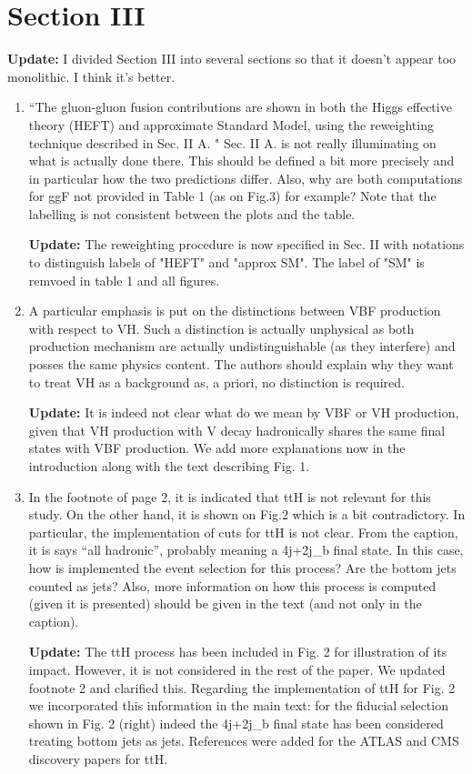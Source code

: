 \documentclass[12pt]{article}
\begin{document}
\section*{Section III}
{\bf Update:} I divided Section III into several sections so that it doesn't appear too monolithic. I think it's better. 
\begin{enumerate}
\item ``The gluon-gluon fusion contributions are shown in both the Higgs effective theory (HEFT) and approximate Standard Model, using the reweighting technique described in Sec. II A. " Sec. II A. is not really illuminating on what is actually done there. This should be defined a bit more precisely and in particular how the two predictions differ. Also, why are both computations for ggF not provided in Table 1 (as on Fig.3) for example? Note that the labelling is not consistent between the plots and the table.

{\bf Update:} The reweighting procedure is now specified in Sec. II with notations to distinguish labels of "HEFT" and "approx SM". The label of "SM" is remvoed in table 1 and all figures. 

\item A particular emphasis is put on the distinctions between VBF production with respect to VH. Such a distinction is actually unphysical as both production mechanism are actually undistinguishable (as they interfere) and posses the same physics content. The authors should explain why they want to treat VH as a background as, a priori, no distinction is required.

{\bf Update:} It is indeed not clear what do we mean by VBF or VH production, given that VH production with V decay hadronically shares the same final states with VBF production. We add more explanations now in the introduction along with the text describing Fig. 1.

\item In the footnote of page 2, it is indicated that ttH is not relevant for this study. On the other hand, it is shown on Fig.2 which is a bit contradictory. In particular, the implementation of cuts for ttH is not clear. From the caption, it is says “all hadronic”, probably meaning a 4j+2j\_b final state. In this case, how is implemented the event selection for this process? Are the bottom jets counted as jets? Also, more information on how this process is computed (given it is presented) should be given in the text (and not only in the caption).

{\bf Update:} The ttH process has been included in Fig. 2 for illustration of its impact. However, it is not considered in the rest of the paper. We updated footnote 2 and clarified this. Regarding the implementation of ttH for Fig. 2 we incorporated this information in the main text: for the fiducial selection shown in Fig. 2 (right) indeed the 4j+2j\_b final state has been considered treating bottom jets as jets. References were added for the ATLAS and CMS discovery papers for ttH.


\end{enumerate}
\end{document}
